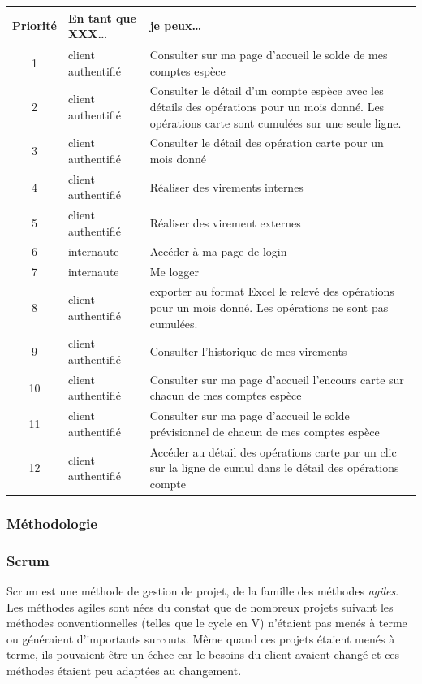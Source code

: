 \begin{tabular}{| c | l | p{8cm} |}
\hline 
Priorité & En tant que XXX\ldots  & je peux\ldots \\ 
\hline 
1 & client authentifié & Consulter sur ma page d'accueil le solde de mes comptes espèce\\ 
\hline 
2 & client authentifié & Consulter le détail d'un compte espèce avec les détails des opérations pour un mois donné. Les opérations carte sont cumulées sur une seule ligne. \\ 
\hline 
3 & client authentifié & Consulter le détail des opération carte pour un mois donné \\ 
\hline 
4 & client authentifié & Réaliser des virements internes \\ 
\hline 
5 & client authentifié & Réaliser des virement externes \\ 
\hline 
6 & internaute & Accéder à ma page de login \\ 
\hline 
7 & internaute & Me logger \\ 
\hline 
8 & client authentifié & exporter au format Excel le relevé des opérations pour un mois donné. Les opérations ne sont pas cumulées.\\ 
\hline 
9 & client authentifié & Consulter l'historique de mes virements \\ 
\hline 
10 & client authentifié & Consulter sur ma page d'accueil l'encours carte sur chacun de mes comptes espèce \\ 
\hline 
11 & client authentifié & Consulter sur ma page d'accueil le solde prévisionnel de chacun de mes comptes espèce \\ 
\hline 
12 & client authentifié & Accéder au détail des opérations carte par un clic sur la ligne de cumul dans le détail des opérations compte \\ 
\hline 
\end{tabular} 

\subsubsection{Méthodologie}

\subsubsection*{Scrum}

Scrum est une méthode de gestion de projet, de la famille des méthodes \textit{agiles}.\\
Les méthodes agiles sont nées du constat que de nombreux projets suivant les méthodes \og conventionnelles \fg{} (telles que le cycle en V) n'étaient pas menés à terme ou généraient d'importants surcouts. Même quand ces projets étaient menés à terme, ils pouvaient être un échec car le besoins du client avaient changé et ces méthodes étaient peu adaptées au changement.\\

